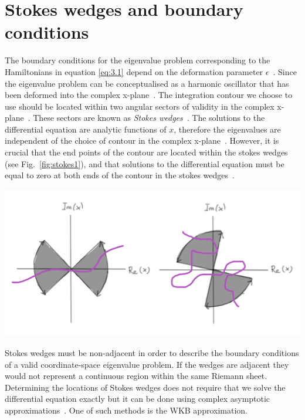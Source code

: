 \documentclass[12pt, a4paper]{report}
\newenvironment{Figure}
    {\par\medskip\noindent\minipage{\linewidth}}
    {\endminipage\par\medskip}
\begin{document}
\section{Stokes wedges and boundary conditions}\label{Stokes}
The boundary conditions for the eigenvalue problem corresponding to the Hamiltonians in equation \ref{eq:3.1} depend on the deformation parameter $\epsilon$~\cite{MakingSense}. Since the eigenvalue problem can be conceptualised as a harmonic oscillator that has been deformed into the complex x-plane~\cite{AnalyticContinuation}. The integration contour we choose to use should be located within two angular sectors of validity in the complex x-plane~\cite{BenderOrszag}. These sectors are known as \emph{Stokes wedges}~\cite{MakingSense}. The solutions to the differential equation are analytic functions of $x$, therefore the eigenvalues are independent of the choice of contour in the complex x-plane~\cite{PTsymmetricQM, Sorrell}. However, it is crucial that the end points of the contour are located within the stokes wedges (see Fig.~\ref{fig:stokes1}), and that solutions to the differential equation must be equal to zero at both ends of the contour in the stokes wedges~\cite{Faria1}. 
\begin{Figure}
\centering
\includegraphics[width=.9\linewidth]{stokes1.pdf}
\label{fig:stokes1}
\end{Figure}
Stokes wedges must be non-adjacent in order to describe the boundary conditions of a valid coordinate-space eigenvalue problem. If the wedges are adjacent they would not represent a continuous region within the same Riemann sheet.
Determining the locations of Stokes wedges does not require that we solve the differential equation exactly but it can be done using complex asymptotic approximations~\cite{PTsymmetricQM}. One of such methods is the WKB approximation. 
\end{document}

